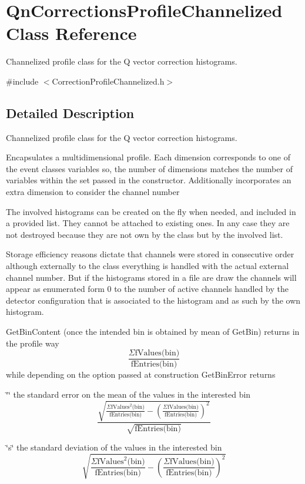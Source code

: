 \hypertarget{classQnCorrectionsProfileChannelized}{}\section{Qn\+Corrections\+Profile\+Channelized Class Reference}
\label{classQnCorrectionsProfileChannelized}


Channelized profile class for the Q vector correction histograms.  




{\ttfamily \#include $<$Correction\+Profile\+Channelized.\+h$>$}



\subsection{Detailed Description}
Channelized profile class for the Q vector correction histograms. 

Encapsulates a multidimensional profile. Each dimension corresponds to one of the event classes variables so, the number of dimensions matches the number of variables within the set passed in the constructor. Additionally incorporates an extra dimension to consider the channel number

The involved histograms can be created on the fly when needed, and included in a provided list. They cannot be attached to existing ones. In any case they are not destroyed because they are not own by the class but by the involved list.

Storage efficiency reasons dictate that channels were stored in consecutive order although externally to the class everything is handled with the actual external channel number. But if the histograms stored in a file are draw the channels will appear as enumerated form 0 to the number of active channels handled by the detector configuration that is associated to the histogram and as such by the own histogram.

Get\+Bin\+Content (once the intended bin is obtained by mean of Get\+Bin) returns in the profile way \[ \frac{\Sigma \mbox{fValues(bin)}}{\mbox{fEntries(bin)}} \] while depending on the option passed at construction Get\+Bin\+Error returns
\begin{DoxyItemize}
\item \char`\"{}\char`\"{} the standard error on the mean of the values in the interested bin \[ \frac{\sqrt{\frac{\Sigma \mbox{fValues}^2\mbox{(bin)}}{\mbox{fEntries(bin)}} - \left(\frac{\Sigma \mbox{fValues(bin)}}{\mbox{fEntries(bin)}}\right)^2}} {\sqrt{\mbox{fEntries(bin)}}} \]
\item \char`\"{}s\char`\"{} the standard deviation of the values in the interested bin \[ \sqrt{\frac{\Sigma \mbox{fValues}^2\mbox{(bin)}}{\mbox{fEntries(bin)}} - \left(\frac{\Sigma \mbox{fValues(bin)}}{\mbox{fEntries(bin)}}\right)^2} \]
\end{DoxyItemize}

